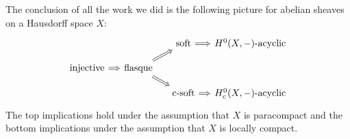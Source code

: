 The conclusion of all the work we did is the following picture for abelian sheaves on a Hausdorff space \(X\):
\begin{equation*}
  \begin{tikzcd}[arrows=Rightarrow, column sep=small, row sep=small]
    & & \textup{soft} \ar[r] & \textup{\(H^0(X,-)\)-acyclic} \\
    \textup{injective} \ar[r] & \textup{flasque} \ar[ru] \ar[rd] \\
    & & \textup{c-soft} \ar[r] & \textup{\(H^0_c(X,-)\)-acyclic}
  \end{tikzcd}
\end{equation*}
The top implications hold under the assumption that \(X\) is paracompact and the bottom implications under the assumption that \(X\) is locally compact.

